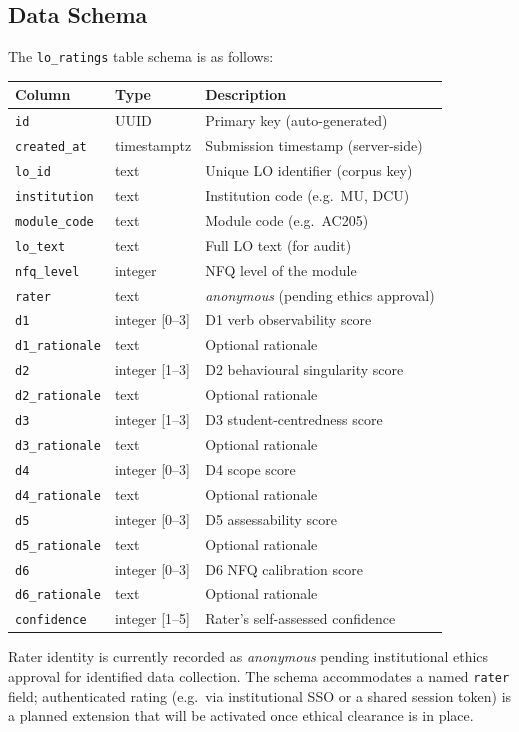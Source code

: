 \documentclass[12pt, a4paper]{article}
\begin{document}
\subsection{Data Schema}

The \texttt{lo\_ratings} table schema is as follows:

\begin{center}
\begin{tabular}{lll}
\toprule
Column & Type & Description \\
\midrule
\texttt{id} & UUID & Primary key (auto-generated) \\
\texttt{created\_at} & timestamptz & Submission timestamp (server-side) \\
\texttt{lo\_id} & text & Unique LO identifier (corpus key) \\
\texttt{institution} & text & Institution code (e.g.\ MU, DCU) \\
\texttt{module\_code} & text & Module code (e.g.\ AC205) \\
\texttt{lo\_text} & text & Full LO text (for audit) \\
\texttt{nfq\_level} & integer & NFQ level of the module \\
\texttt{rater} & text & \textit{anonymous} (pending ethics approval) \\
\texttt{d1} & integer [0--3] & D1 verb observability score \\
\texttt{d1\_rationale} & text & Optional rationale \\
\texttt{d2} & integer [1--3] & D2 behavioural singularity score \\
\texttt{d2\_rationale} & text & Optional rationale \\
\texttt{d3} & integer [1--3] & D3 student-centredness score \\
\texttt{d3\_rationale} & text & Optional rationale \\
\texttt{d4} & integer [0--3] & D4 scope score \\
\texttt{d4\_rationale} & text & Optional rationale \\
\texttt{d5} & integer [0--3] & D5 assessability score \\
\texttt{d5\_rationale} & text & Optional rationale \\
\texttt{d6} & integer [0--3] & D6 NFQ calibration score \\
\texttt{d6\_rationale} & text & Optional rationale \\
\texttt{confidence} & integer [1--5] & Rater's self-assessed confidence \\
\bottomrule
\end{tabular}
\end{center}

\noindent
Rater identity is currently recorded as \textit{anonymous} pending institutional
ethics approval for identified data collection. The schema accommodates a named
\texttt{rater} field; authenticated rating (e.g.\ via institutional SSO or a
shared session token) is a planned extension that will be activated once ethical
clearance is in place.
\end{document}
